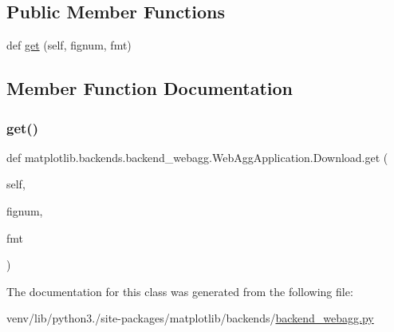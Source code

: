 \subsection*{Public Member Functions}
\begin{DoxyCompactItemize}
\item 
def \hyperlink{classmatplotlib_1_1backends_1_1backend__webagg_1_1WebAggApplication_1_1Download_af604558493aace7eb8035f89b08791da}{get} (self, fignum, fmt)
\end{DoxyCompactItemize}


\subsection{Member Function Documentation}
\mbox{\label{classmatplotlib_1_1backends_1_1backend__webagg_1_1WebAggApplication_1_1Download_af604558493aace7eb8035f89b08791da}} 
\subsubsection{\texorpdfstring{get()}{get()}}
{\footnotesize\ttfamily def matplotlib.\+backends.\+backend\+\_\+webagg.\+Web\+Agg\+Application.\+Download.\+get (\begin{DoxyParamCaption}\item[{}]{self,  }\item[{}]{fignum,  }\item[{}]{fmt }\end{DoxyParamCaption})}



The documentation for this class was generated from the following file\+:\begin{DoxyCompactItemize}
\item 
venv/lib/python3./site-\/packages/matplotlib/backends/\hyperlink{backend__webagg_8py}{backend\+\_\+webagg.\+py}\end{DoxyCompactItemize}

